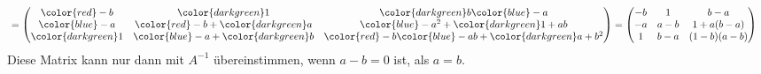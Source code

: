\begin{loesung}
\begin{align*}
&=
\begin{pmatrix}
{\color{red}-b}      &{\color{darkgreen}1}                 &{\color{darkgreen}b}{\color{blue}-a}        \\
{\color{blue}-a}     &{\color{red}-b}+{\color{darkgreen}a} &{\color{blue}-a^2}+{\color{darkgreen}1+ab}  \\
{\color{darkgreen}1} &{\color{blue}-a}+{\color{darkgreen}b}&{\color{red}-b}{\color{blue}-ab}+{\color{darkgreen}a+b^2}\\
\end{pmatrix}
=
\begin{pmatrix}
-b       & 1         &b-a        \\
-a       &a-b       &1+a(b-a)  \\
 1       &b-a       &(1-b)(a-b)\\
\end{pmatrix}
\end{align*}
Diese Matrix kann nur dann mit $A^{-1}$ übereinstimmen, wenn $a-b=0$ ist, 
als $a=b$.
\end{loesung}


